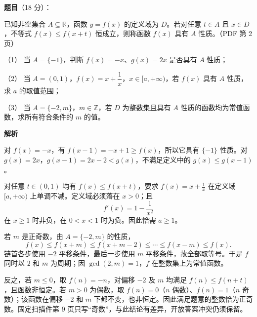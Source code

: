 \begin{answer}

\textbf{题目}（18 分）：

已知非空集合 $A\subseteq\mathbb R$，函数 $y=f(x)$ 的定义域为 $D$。若对任意 $t\in A$ 且 $x\in D$，不等式 $f(x)\leq f(x+t)$ 恒成立，则称函数 $f(x)$ 具有 $A$ 性质。（PDF 第 2 页）

（1） 当 $A=\{-1\}$，判断 $f(x)=-x$、$g(x)=2x$ 是否具有 $A$ 性质；

（2） 当 $A=(0,1)$，$f(x)=x+\dfrac1x$，$x\in[a,+\infty)$，若 $f(x)$ 具有 $A$ 性质，求 $a$ 的取值范围；

（3） 当 $A=\{-2,m\}$，$m\in\mathbb Z$，若 $D$ 为整数集且具有 $A$ 性质的函数均为常值函数，求所有符合条件的 $m$ 的值。

\textbf{解析}


对 $f(x)=-x$，有 $f(x-1)=-x+1\ge f(x)$，所以它具有 $\{-1\}$ 性质。对 $g(x)=2x$，$g(x-1)=2x-2<g(x)$，不满足定义中的 $g(x)\le g(x-1)$。


对任意 $t\in(0,1)$ 均有 $f(x)\le f(x+t)$，要求 $f(x)=x+\frac1x$ 在定义域 $[a,+\infty)$ 上单调不减。定义域必须落在 $x>0$；且
\nopagebreak[4]
\[
f'(x)=1-\frac1{x^2}
\]
在 $x\ge1$ 时非负，在 $0<x<1$ 时为负。因此恰需 $a\ge1$。


若 $m$ 是正奇数，由 $A=\{-2,m\}$ 的性质，
\nopagebreak[4]
\[
f(x)\le f(x+m)\le f(x+m-2)\le\cdots\le f(x-m)\le f(x).
\]
链首各步使用 $-2$ 平移条件，最后一步使用 $m$ 平移条件，故全部取等号。于是 $f$ 同时以 $2$ 和 $m$ 为周期；因 $\gcd(2,m)=1$，$f$ 在整数集上为常值函数。

反之，若 $m\le0$，取 $f(n)=-n$，对偏移 $-2$ 及 $m$ 均满足 $f(n)\le f(n+t)$，且函数非恒定。若 $m>0$ 为偶数，取 $f(n)=0$（$n$ 偶数）、$f(n)=1$（$n$ 奇数）；该函数在偏移 $-2$ 和 $m$ 下都不变，也非恒定。因此满足题意的整数恰为正奇数。固定扫描件第 9 页只写“奇数”，与此结论有差异，开放答案冲突仍须保留。


\gkanswer{答案（2）：$a\in[1,+\infty)$}


\end{answer}